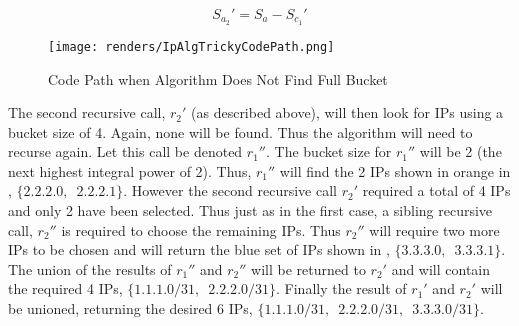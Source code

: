 \begin{equation}\label{eq:availableIpsSecondRecurse}
S_{a_2}' = S_a - S_{c_1}'
\end{equation}

\begin{figure}[H]
      \centering
      \texttt{[image: renders/IpAlgTrickyCodePath.png]}
      \caption{Code Path when Algorithm Does Not Find Full Bucket}
      \label{fig:ipAlgTrickyCodePath}
\end{figure}

The second recursive call, $r_2'$ (as described above), will then look for IPs using a bucket size of 4. Again, none will be found. Thus the algorithm will need to recurse again. Let this call be denoted $r_1''$. The bucket size for $r_1''$ will be 2 (the next highest integral power of 2). Thus, $r_1''$ will find the 2 IPs shown in orange in , $\{2.2.2.0,\enspace2.2.2.1\}$. However the second recursive call $r_2'$ required a total of 4 IPs and only 2 have been selected. Thus just as in the first case, a sibling recursive call, $r_2''$ is required to choose the remaining IPs. Thus $r_2''$ will require two more IPs to be chosen and will return the blue set of IPs shown in , $\{3.3.3.0,\enspace3.3.3.1\}$. The union of the results of $r_1''$ and $r_2''$ will be returned to $r_2'$ and will contain the required 4 IPs, $\{1.1.1.0/31,\enspace2.2.2.0/31\}$. Finally the result of $r_1'$ and $r_2'$ will be unioned, returning the desired 6 IPs, $\{1.1.1.0/31,\enspace2.2.2.0/31,\enspace3.3.3.0/31\}$.

